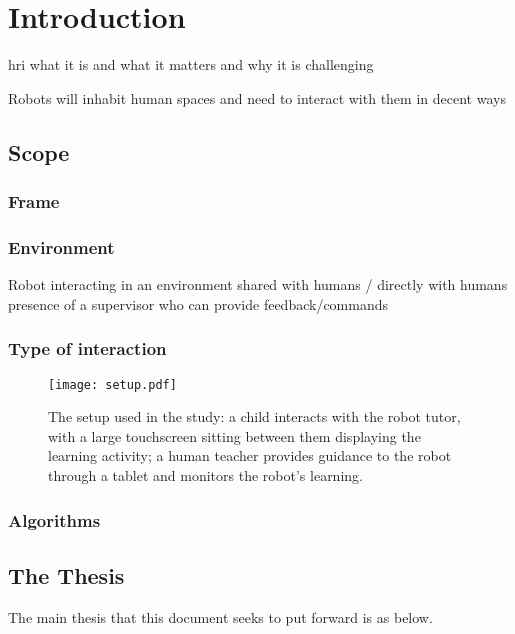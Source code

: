 \chapter{Introduction} \label{chap:intro}

\gls{hri} what it is and what it matters and why it is challenging

Robots will inhabit human spaces and need to interact with them in decent ways

\section{Scope}\label{sec:intro-scope}

\subsection{Frame}

\subsection{Environment} \label{sec:scope-social}
Robot interacting in an environment shared with humans / directly with humans
presence of a supervisor who can provide feedback/commands

\subsection{Type of interaction}

\begin{figure}[ht]
	\texttt{[image: setup.pdf]}
	\centering
	\caption{The setup used in the study: a child interacts with the robot tutor, with a large touchscreen sitting between them displaying the learning activity; a human teacher provides guidance to the robot through a tablet and monitors the robot's learning.}
	\label{fig:setup}
\end{figure}

\subsection{Algorithms}


\section{The Thesis}\label{sec:intro-thesis}
The main thesis that this document seeks to put forward is as below.

